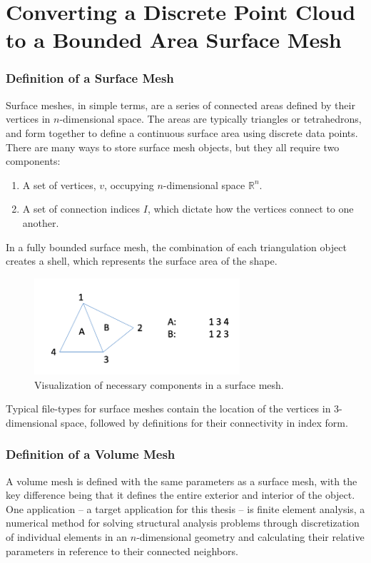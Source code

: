 \documentclass[12pt]{drexelthesis}
\let\Oldsection\section
\renewcommand{\section}{\FloatBarrier\Oldsection}
\let\Oldsubsubsection\subsubsection
\renewcommand{\subsubsection}{\FloatBarrier\Oldsubsubsection}
\begin{document}
\section{Converting a Discrete Point Cloud to a Bounded Area Surface Mesh}
\label{subsec:meshing}
\subsubsection{Definition of a Surface Mesh}
\label{subsubsec:surfdef}
Surface meshes, in simple terms, are a series of connected areas defined by their vertices in $n$-dimensional space. The areas are typically triangles or tetrahedrons, and form together to define a continuous surface area using discrete data points. There are many ways to store surface mesh objects, but they all require two components:

\begin{enumerate}
	\item A set of vertices, $v$, occupying $n$-dimensional space $\mathbb{R}^{n}$.
	\item A set of connection indices $I$, which dictate how the vertices connect to one another.
\end{enumerate}

In a fully bounded surface mesh, the combination of each triangulation object creates a shell, which represents the surface area of the shape.

\begin{figure}[!ht]
	\centering
	\includegraphics[width=3in]{points2surface/surface_mesh.png}
	\caption[Simple example of surface mesh components]{Visualization of necessary components in a surface mesh.}
	\label{meshing:surface_mesh}
\end{figure}

Typical file-types for surface meshes contain the location of the vertices in 3-dimensional space, followed by definitions for their connectivity in index form.

\subsubsection{Definition of a Volume Mesh}
A volume mesh is defined with the same parameters as a surface mesh, with the key difference being that it defines the entire exterior and interior of the object.
One application -- a target application for this thesis -- is finite element analysis, a numerical method for solving structural analysis problems through discretization of individual elements in an $n$-dimensional geometry and calculating their relative parameters in reference to their connected neighbors.
\end{document}
